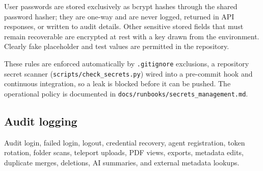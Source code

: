 User passwords are stored exclusively as bcrypt hashes through the shared password hasher; they are one-way and are never logged, returned in API responses, or written to audit details. Other sensitive stored fields that must remain recoverable are encrypted at rest with a key drawn from the environment. Clearly fake placeholder and test values are permitted in the repository.

These rules are enforced automatically by \texttt{.gitignore} exclusions, a repository secret scanner (\texttt{scripts/check\_secrets.py}) wired into a pre-commit hook and continuous integration, so a leak is blocked before it can be pushed. The operational policy is documented in \texttt{docs/runbooks/secrets\_management.md}.

\subsection{Audit logging}

Audit login, failed login, logout, credential recovery, agent registration, token rotation, folder scans, teleport uploads, PDF views, exports, metadata edits, duplicate merges, deletions, AI summaries, and external metadata lookups.
